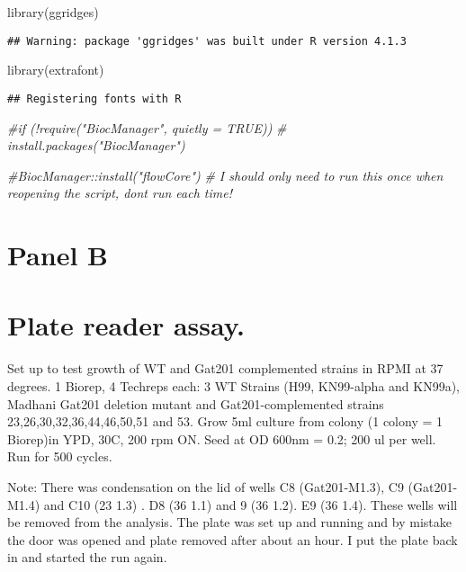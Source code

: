 \documentclass[
]{article}
\newenvironment{Shaded}{\begin{snugshade}}{\end{snugshade}}
\newcommand{\CommentTok}[1]{\textcolor[rgb]{0.56,0.35,0.01}{\textit{#1}}}
\newcommand{\FunctionTok}[1]{\textcolor[rgb]{0.00,0.00,0.00}{#1}}
\newcommand{\NormalTok}[1]{#1}
\begin{document}
\begin{Shaded}
\begin{Highlighting}[]
\FunctionTok{library}\NormalTok{(ggridges)}
\end{Highlighting}
\end{Shaded}

\begin{verbatim}
## Warning: package 'ggridges' was built under R version 4.1.3
\end{verbatim}

\begin{Shaded}
\begin{Highlighting}[]
\FunctionTok{library}\NormalTok{(extrafont)}
\end{Highlighting}
\end{Shaded}

\begin{verbatim}
## Registering fonts with R
\end{verbatim}

\begin{Shaded}
\begin{Highlighting}[]
\CommentTok{\#if (!require("BiocManager", quietly = TRUE))}
\CommentTok{\#    install.packages("BiocManager")}

\CommentTok{\#BiocManager::install("flowCore")}
\CommentTok{\# I should only need to run this once when reopening the script, don\textquotesingle{}t run each time!}
\end{Highlighting}
\end{Shaded}

\hypertarget{panel-b}{%
\section{Panel B}\label{panel-b}}

\hypertarget{plate-reader-assay.}{%
\section{Plate reader assay.}\label{plate-reader-assay.}}

Set up to test growth of WT and Gat201 complemented strains in RPMI at
37 degrees. 1 Biorep, 4 Techreps each: 3 WT Strains (H99, KN99-alpha and
KN99a), Madhani Gat201 deletion mutant and Gat201-complemented strains
23,26,30,32,36,44,46,50,51 and 53. Grow 5ml culture from colony (1
colony = 1 Biorep)in YPD, 30C, 200 rpm ON. Seed at OD 600nm = 0.2; 200
ul per well. Run for 500 cycles.

Note: There was condensation on the lid of wells C8 (Gat201-M1.3), C9
(Gat201-M1.4) and C10 (23 1.3) . D8 (36 1.1) and 9 (36 1.2). E9 (36
1.4). These wells will be removed from the analysis. The plate was set
up and running and by mistake the door was opened and plate removed
after about an hour. I put the plate back in and started the run again.
\end{document}
